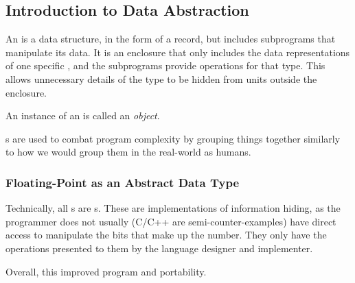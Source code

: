 \subsection{Introduction to Data Abstraction}\label{subsec:Intro_Data_Abstraction}
An \emph{} is a data structure, in the form of a record, but includes subprograms that manipulate its data.
It is an enclosure that only includes the data representations of one specific , and the subprograms provide operations for that type.
This allows unnecessary details of the type to be hidden from units outside the enclosure.

\begin{definition}[Object]\label{def:Object}
  An instance of an  is called an \emph{object}.
\end{definition}

s are used to combat program complexity by grouping things together similarly to how we would group them in the real-world as humans.

\subsubsection{Floating-Point as an Abstract Data Type}\label{subsubsec:Floating_Point_Abstract_Data_Type}
Technically, all s are s.
These are implementations of information hiding, as the programmer does not usually (C/C++ are semi-counter-examples) have direct access to manipulate the bits that make up the number.
They only have the operations presented to them by the language designer and implementer.

Overall, this improved program  and portability.


